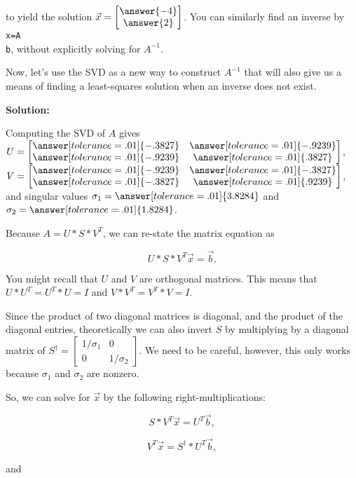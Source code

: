 \documentclass{ximera}
\begin{document}
\begin{example}
\begin{verbatim}
\end{verbatim}


to yield the solution  $\vec{x}=\begin{bmatrix}
  \answer{-4}\\\answer{2}
\end{bmatrix}$. You can similarly find an inverse by \texttt{x=A\\b}, without explicitly solving for $A^{-1}$.

Now, let's use the SVD as a new way to construct $A^{-1}$ that will also give us a means of finding a least-squares solution when an inverse does not exist. 

\textbf{Solution:}

Computing the SVD of $A$ gives $U=\begin{bmatrix}
  \answer[tolerance=.01]{-.3827} & \answer[tolerance=.01]{-.9239}\\
  \answer[tolerance=.01]{-.9239} & \answer[tolerance=.01]{.3827}
\end{bmatrix}$,  
$V=\begin{bmatrix}
  \answer[tolerance=.01]{-.9239} & \answer[tolerance=.01]{-.3827}\\
  \answer[tolerance=.01]{-.3827} & \answer[tolerance=.01]{.9239}
\end{bmatrix}$,  
and singular values $\sigma_1=\answer[tolerance=.01]{3.8284}$ and $\sigma_2=\answer[tolerance=.01]{1.8284}$.

Because $A=U*S*V^T$, we can re-state the matrix equation as 

$$U*S*V^T\vec{x}=\vec{b}.$$

You might recall that $U$ and $V$ are orthogonal matrices. This means that $U*U^T=U^T*U=I$ and $V*V^T=V^T*V=I$. 

Since the product of two diagonal matrices is diagonal, and the product of the diagonal entries, theoretically we can also invert $S$ by multiplying by a diagonal matrix of $S^\dagger=\begin{bmatrix}
  1/\sigma_1 & 0\\0 & 1/\sigma_2
\end{bmatrix}$. We need to be careful, however, this only works because $\sigma_1$ and $\sigma_2$ are nonzero. 

So, we can solve for $\vec{x}$ by the following right-multiplications:

$$S*V^T\vec{x}=U^T\vec{b},$$

$$V^T\vec{x}=S^\dagger*U^T\vec{b},$$

and


\end{example}
\end{document}
